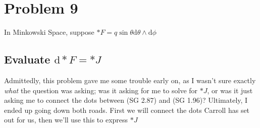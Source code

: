\section{Problem 9}
In Minkowski Space, suppose $ \ast F = q  \sin{\theta}  \textrm{d} \theta  \wedge  \textrm{d} \phi$

\subsection{Evaluate  $ \textrm{d} \ast F = \ast J $}

Admittedly, this problem gave me some trouble early on, as I wasn't sure exactly \textit{what} the question was asking; was it asking for me to solve for $ \ast J $, or was it just asking me to connect the dots between (SG 2.87) and (SG 1.96)? Ultimately, I ended up going down both roads. First we will connect the dots Carroll has set out for us, then we'll use this to express $ \ast J $ 

